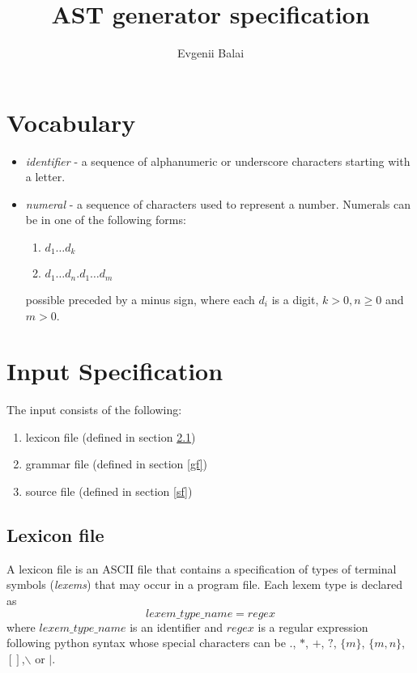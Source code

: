 \documentclass[a4paper,10pt]{article}
\title{AST generator specification}
\author{Evgenii Balai}
\def\st{\noindent}
\begin{document}
\maketitle
\st

\tableofcontents
\section{Vocabulary}

\begin{itemize}
\item \textit{identifier} -  a sequence of alphanumeric or underscore characters starting with a letter.
\item \textit{numeral} - a sequence of characters used to represent a number. Numerals can be in one of the following forms:
\begin{enumerate}
\item $d_1\ldots d_k$
\item $d_1\ldots d_n.d_1\ldots d_m$
\end{enumerate}
possible preceded by a minus sign,
where each $d_i$ is a digit, $k > 0, n\ge 0$ and $m >0$.
\end{itemize}


\section{Input Specification}
The input consists of the following:
\begin{enumerate}
\item lexicon file (defined in section \ref{lf})
\item grammar file (defined in section \ref{gf}) 
\item source file (defined in section \ref{sf})
\end{enumerate}

\subsection{Lexicon file}\label{lf}

A lexicon file is an ASCII file that contains a specification of types of terminal symbols (\textit{lexems}) that may occur in a program file.
Each lexem type is declared as 
\begin{equation}\label{lexdef}
lexem\_type\_name = regex
\end{equation}
where $lexem\_type\_name$ is an identifier and $regex$ is a regular expression following python syntax\cite{pythonre} whose special characters can be $.$, $*$, $+$, $?$, $\{m\}$, $\{m,n\}$, $[]$,$\backslash$ or $|$.
\end{document}
